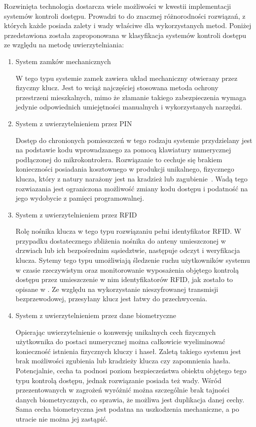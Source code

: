 		Rozwinięta technologia dostarcza wiele możliwości w kwestii implementacji systemów kontroli dostępu. Prowadzi to do znacznej różnorodności rozwiązań, z których każde posiada zalety i wady właściwe dla wykorzystanych metod. Poniżej przedstawiona została zaproponowana w \cite{access-system-survey} klasyfikacja systemów kontroli dostępu ze względu na metodę uwierzytelniania:
		\begin{enumerate}[label=\Alph*.]
			\item System zamków mechanicznych

				W tego typu systemie zamek zawiera układ mechaniczny otwierany przez fizyczny klucz. Jest to wciąż najczęściej stosowana metoda ochrony przestrzeni mieszkalnych, mimo że złamanie takiego zabezpieczenia wymaga jedynie odpowiednich umiejętności manualnych i wykorzystanych narzędzi.

			\item System z uwierzytelnieniem przez PIN

				Dostęp do chronionych pomieszczeń w tego rodzaju systemie przydzielany jest na podstawie kodu wprowadzanego za pomocą klawiatury numerycznej podłączonej do mikrokontrolera. Rozwiązanie to cechuje się brakiem konieczności posiadania kosztownego w produkcji unikalnego, fizycznego klucza, który z natury narażony jest na kradzież lub zagubienie~\cite{keypad-access-system}. Wadą tego rozwiazania jest ograniczona możliwość zmiany kodu dostępu i podatność na jego wydobycie z pamięci programowalnej.

			\item System z uwierzytelnieniem przez RFID

				Rolę nośnika klucza w tego typu rozwiązaniu pełni identyfikator RFID. W przypadku dostatecznego zbliżenia nośnika do anteny umieszczonej w drzwiach lub ich bezpośrednim sąsiedztwie, następuje odczyt i weryfikacja klucza. Sytemy tego typu umożliwiają śledzenie ruchu użytkowników systemu w czasie rzeczywistym oraz monitorowanie wyposażenia objętego kontrolą dostępu przez umieszczenie w nim identyfikatorów RFID, jak zostało to opisane w \cite{rfid-access-system-for-university}. Ze względu na wykorzystanie nieszyfrowanej transmisji bezprzewodowej, przesyłany klucz jest łatwy do przechwycenia.

			\item System z uwierzytelnieniem przez dane biometryczne

				Opierając uwierzytelnienie o konwersję unikalnych cech fizycznych użytkownika do postaci numerycznej można całkowicie wyeliminować konieczność istnienia fizycznych kluczy i haseł. Zaletą takiego systemu jest brak możliwości zgubienia lub kradzieży klucza czy zapomnienia hasła. Potencjalnie, cecha ta podnosi poziom bezpieczeństwa obiektu objętego tego typu kontrolą dostępu, jednak rozwiązanie posiada też wady. Wśród przezentowanych w \cite{biometric-system-vulnerabilities} zagrożeń wyróżnić można szczególnie brak tajności danych biometrycznych, co sprawia, że możliwa jest duplikacja danej cechy. Sama cecha biometryczna jest podatna na uszkodzenia mechaniczne, a po utracie nie można jej zastąpić.


\end{enumerate}
